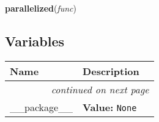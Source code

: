     \vspace{0.5ex}

\hspace{.8\funcindent}\begin{boxedminipage}{\funcwidth}

    \raggedright \textbf{parallelized}(\textit{func})

\setlength{\parskip}{2ex}
\setlength{\parskip}{1ex}
    \end{boxedminipage}



  \subsection{Variables}

    \vspace{-1cm}
\hspace{\varindent}\begin{longtable}{|p{\varnamewidth}|p{\vardescrwidth}|l}
\cline{1-2}
\cline{1-2} \centering \textbf{Name} & \centering \textbf{Description}& \\
\cline{1-2}
\endhead\cline{1-2}\multicolumn{3}{r}{\small\textit{continued on next page}}\\\endfoot\cline{1-2}
\endlastfoot\raggedright \_\-\_\-p\-a\-c\-k\-a\-g\-e\-\_\-\_\- & \raggedright \textbf{Value:} 
{\tt None}&\\
\cline{1-2}
\end{longtable}

